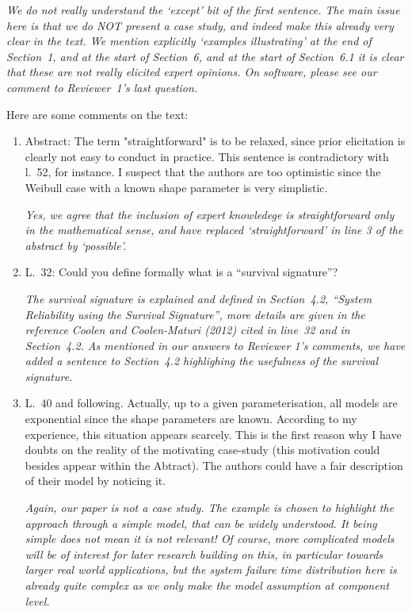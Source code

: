 \documentclass[Journal,SectionNumbers,SingleSpace,InsideFigs]{ascelike}
\begin{document}
\smallskip

\emph{We do not really understand the `except' bit of the first sentence.
The main issue here is that we do NOT present a case study, and indeed make this already very clear in the text.
We mention explicitly `examples illustrating' at the end of Section~1,
and at the start of Section~6, and at the start of Section~6.1 it is clear that these are not really elicited expert opinions.
On software, please see our comment to Reviewer~1's last question.}

\smallskip

Here are some comments on the text:

\begin{enumerate}
\item Abstract: The term "straightforward" is to be relaxed, since prior elicitation is clearly not easy to conduct in practice.
This sentence is contradictory with l.~52, for instance.
I suspect that the authors are too optimistic since the Weibull case with a known shape parameter is very simplistic.

\smallskip
\emph{Yes, we agree that the inclusion of expert knowledege is straightforward only in the mathematical sense,
and have replaced `straightforward' in line 3 of the abstract by `possible'.}

\smallskip
\item L.~32: Could you define formally what is a ``survival signature''?

\smallskip
\emph{The survival signature is explained and defined in Section~4.2, ``System Reliability using the Survival Signature'',
more details are given in the reference Coolen and Coolen-Maturi (2012) cited in line~32 and in Section~4.2.
As mentioned in our answers to Reviewer 1's comments,
we have added a sentence to Section~4.2 highlighing the usefulness of the survival signature.}

\smallskip
\item L.~40 and following. Actually, up to a given parameterisation, all models are exponential since the shape parameters are known.
According to my experience, this situation appears scarcely.
This is the first reason why I have doubts on the reality of the motivating case-study (this motivation could besides appear within the Abtract).
The authors could have a fair description of their model by noticing it.

\smallskip
\emph{Again, our paper is not a case study.
The example is chosen to highlight the approach through a simple model, that can be widely understood.
It being simple does not mean it is not relevant!
Of course, more complicated models will be of interest for later research building on this,
in particular towards larger real world applications,
but the system failure time distribution here is already quite complex as we only make the model assumption at component level.}


\end{enumerate}
\end{document}
